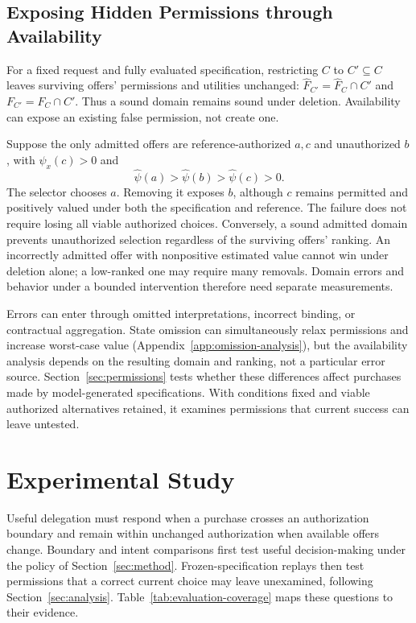 \documentclass[11pt]{article}
\begin{document}
\subsection{Exposing Hidden Permissions through Availability}
For a fixed request and fully evaluated specification, restricting $C$ to $C'\subseteq C$ leaves surviving offers' permissions and utilities unchanged: $\widehat F_{C'}=\widehat F_C\cap C'$ and $F_{C'}=F_C\cap C'$. Thus a sound domain remains sound under deletion. Availability can expose an existing false permission, not create one.

Suppose the only admitted offers are reference-authorized $a,c$ and unauthorized $b$, with $\psi_x(c)>0$ and
\begin{equation}
\widehat\psi(a)>\widehat\psi(b)>\widehat\psi(c)>0.
\label{eq:masking}
\end{equation}
The selector chooses $a$. Removing it exposes $b$, although $c$ remains permitted and positively valued under both the specification and reference. The failure does not require losing all viable authorized choices. Conversely, a sound admitted domain prevents unauthorized selection regardless of the surviving offers' ranking. An incorrectly admitted offer with nonpositive estimated value cannot win under deletion alone; a low-ranked one may require many removals. Domain errors and behavior under a bounded intervention therefore need separate measurements.

Errors can enter through omitted interpretations, incorrect binding, or contractual aggregation. State omission can simultaneously relax permissions and increase worst-case value (Appendix~\ref{app:omission-analysis}), but the availability analysis depends on the resulting domain and ranking, not a particular error source. Section~\ref{sec:permissions} tests whether these differences affect purchases made by model-generated specifications. With conditions fixed and viable authorized alternatives retained, it examines permissions that current success can leave untested.

\section{Experimental Study}
\label{sec:evaluation}
\label{sec:results}
Useful delegation must respond when a purchase crosses an authorization boundary and remain within unchanged authorization when available offers change. Boundary and intent comparisons first test useful decision-making under the policy of Section~\ref{sec:method}. Frozen-specification replays then test permissions that a correct current choice may leave unexamined, following Section~\ref{sec:analysis}. Table~\ref{tab:evaluation-coverage} maps these questions to their evidence.
\end{document}
